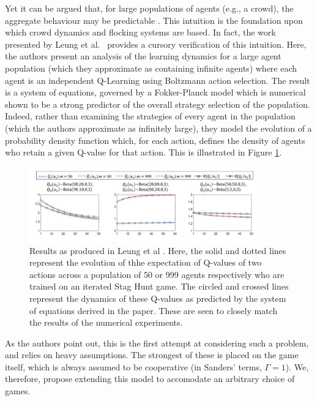 \documentclass[.../main.tex]{subfiles}
\begin{document}
    Yet it can be argued that, for large populations of agents (e.g.,
    a crowd), the aggregate behaviour may be predictable . This
    intuition is the foundation upon which crowd dynamics and flocking
    systems are based. In fact, the work presented by Leung et
    al.~\cite{Hu2019} provides a cursory verification of this
    intuition. Here, the authors present an analysis of the learning
    dynamics for a large agent population (which they approximate as
    containing infinite agents) where each agent is an independent
    Q-Learning using Boltzmann action selection. The result is a
    system of equations, governed by a Fokker-Planck model which is
    numerical shown to be a strong predictor of the overall strategy
    selection of the population. Indeed, rather than examining the
    strategies of every agent in the population (which the authors
    approximate as infinitely large), they model the evolution of a
    probability density function which, for each action, defines the
    density of agents who retain a given Q-value for that action. This
    is illustrated in Figure \ref{fig::LeungPredictions}.

    \begin{figure}[h]
    	\centering
    	\includegraphics[width=0.9\textwidth]{Figures/LeungPredictions}
    	\caption{ \label{fig::LeungPredictions} Results as produced in Leung et al \cite{Hu2019}.
    	Here, the solid and dotted lines represent the evolution of thhe expectation of Q-values of
    	two actions across a population of 50 or 999 agents respectively who are trained on an
    	iterated Stag Hunt game. The circled and crossed
    	lines represent the dynamics of these Q-values as predicted by the system of equations
    	derived in the paper. These are seen to closely match the results of the numerical
    	experiments.}
    \end{figure}

   	As the authors point out, this is the first attempt at considering such a problem, and relies on
	heavy assumptions. The strongest of these is placed on the game itself, which is always
	assumed to be cooperative (in Sanders' terms, $\Gamma = 1$). We, therefore, propose extending
	this model to accomodate an arbitrary choice of games. 
\end{document}
